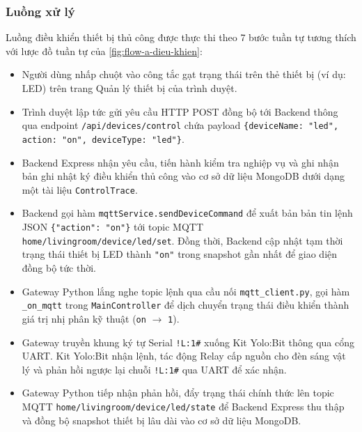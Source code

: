 \subsubsection{Luồng xử lý}
Luồng điều khiển thiết bị thủ công được thực thi theo 7 bước tuần tự tương thích với lược đồ tuần tự của \autoref{fig:flow-a-dieu-khien}:
\begin{itemize}
    \item Người dùng nhấp chuột vào công tắc gạt trạng thái trên thẻ thiết bị (ví dụ: LED) trên trang Quản lý thiết bị của trình duyệt.
    \item Trình duyệt lập tức gửi yêu cầu HTTP POST đồng bộ tới Backend thông qua endpoint \texttt{/api/devices/control} chứa payload \texttt{\{deviceName: "led", action: "on", deviceType: "led"\}}.
    \item Backend Express nhận yêu cầu, tiến hành kiểm tra nghiệp vụ và ghi nhận bản ghi nhật ký điều khiển thủ công vào cơ sở dữ liệu MongoDB dưới dạng một tài liệu \texttt{ControlTrace}.
    \item Backend gọi hàm \texttt{mqttService.sendDeviceCommand} để xuất bản bản tin lệnh JSON \texttt{\{"action": "on"\}} tới topic MQTT \texttt{home/livingroom/device/led/set}. Đồng thời, Backend cập nhật tạm thời trạng thái thiết bị LED thành \texttt{"on"} trong snapshot gần nhất để giao diện đồng bộ tức thời.
    \item Gateway Python lắng nghe topic lệnh qua cầu nối \texttt{mqtt\_client.py}, gọi hàm \texttt{\_on\_mqtt} trong \texttt{MainController} để dịch chuyển trạng thái điều khiển thành giá trị nhị phân kỹ thuật (\texttt{on} $\rightarrow$ \texttt{1}).
    \item Gateway truyền khung ký tự Serial \texttt{!L:1\#} xuống Kit Yolo:Bit thông qua cổng UART. Kit Yolo:Bit nhận lệnh, tác động Relay cấp nguồn cho đèn sáng vật lý và phản hồi ngược lại chuỗi \texttt{!L:1\#} qua UART để xác nhận.
    \item Gateway Python tiếp nhận phản hồi, đẩy trạng thái chính thức lên topic MQTT \texttt{home/livingroom/device/led/state} để Backend Express thu thập và đồng bộ snapshot thiết bị lâu dài vào cơ sở dữ liệu MongoDB.
\end{itemize}



